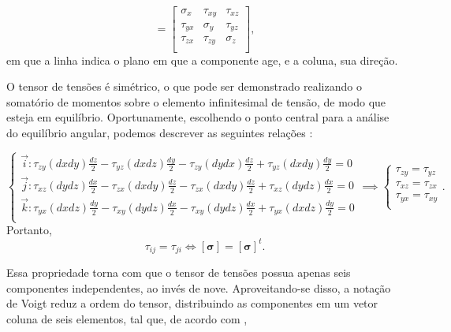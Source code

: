 \begin{equation}
    [\bm{\sigma}] =
    \begin{bmatrix}
        \sigma_x & \tau_{xy} & \tau_{xz} \\
        \tau_{yx} & \sigma_{y} & \tau_{yz} \\
        \tau_{zx} & \tau_{zy} & \sigma_{z} \\
    \end{bmatrix},
\end{equation}
em que a linha indica o plano em que a componente age, e a coluna, sua direção.

O tensor de tensões é simétrico, o que pode ser demonstrado realizando o somatório de momentos sobre o elemento infinitesimal de tensão, de modo que esteja em equilíbrio. Oportunamente, escolhendo o ponto central para a análise do equilíbrio angular, podemos descrever as seguintes relações \cite{popov}:

\begin{equation}
    \begin{cases}
        \displaystyle  \vec{i} : \tau_{zy} (dxdy) \frac{dz}{2} - \tau_{yz} (dx dz) \frac{dy}{2} - \tau_{zy} (dydx) \frac{dz}{2}+ \tau_{yz} (dxdy) \frac{dy}{2} = 0 \\

        \displaystyle  \vec{j} : \tau_{xz} (dydz) \frac{dx}{2} - \tau_{zx} (dx dy) \frac{dz}{2} - \tau_{zx} (dx dy) \frac{dz}{2} + \tau_{xz} (dydz) \frac{dx}{2} = 0 \\

        
        \displaystyle  \vec{k} : \tau_{yx} (dxdz) \frac{dy}{2} - \tau_{xy} (dydz) \frac{dx}{2} - \tau_{xy} (dydz) \frac{dx}{2} + \tau_{yx} (dxdz) \frac{dy}{2} = 0 \\

    \end{cases} \implies
    \begin{cases}
        \tau_{zy} = \tau_{yz} \\
        \tau_{xz} = \tau_{zx} \\
        \tau_{yx} = \tau_{xy} \\
    \end{cases}.
\end{equation}
Portanto,
\begin{equation}
    \tau_{ij} = \tau_{ji} \iff [\bm{\sigma}] = [\bm{\sigma}]^t.
\end{equation}

Essa propriedade torna com que o tensor de tensões possua apenas seis componentes independentes, ao invés de nove. Aproveitando-se disso, a notação de Voigt reduz a ordem do tensor, distribuindo as componentes em um vetor coluna de seis elementos, tal que, de acordo com ,

